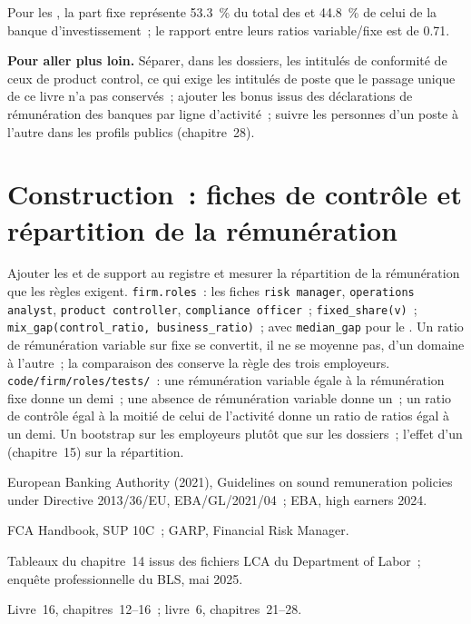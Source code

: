Pour les , la part fixe représente 53.3~\% du total des  et 44.8~\% de celui de la banque d'investissement~; le rapport
entre leurs ratios variable/fixe est de 0.71.

\textbf{Pour aller plus loin.} Séparer, dans les dossiers, les intitulés de conformité de ceux de product control, ce qui exige les intitulés de poste
que le passage unique de ce livre n'a pas conservés~; ajouter les bonus issus des déclarations de rémunération des banques par ligne d'activité~; suivre
les personnes d'un poste à l'autre dans les profils publics (chapitre~28).

\section{Construction~: fiches de contrôle et répartition de la rémunération}\label{bld:in:risk-operations-product-control-and-compliance:roles}

\begin{build}
 Ajouter les  et de support au registre et mesurer la répartition de la rémunération que les règles exigent.
 \texttt{firm.roles}~: les fiches \texttt{risk manager}, \texttt{operations analyst},
\texttt{product controller}, \texttt{compliance officer}~; \texttt{fixed\_share(v)}~; \texttt{mix\_gap(control\_ratio, business\_ratio)}~;
avec \texttt{median\_gap} pour le .
 Un ratio de rémunération variable sur fixe se convertit, il ne se moyenne pas, d'un domaine à l'autre~; la comparaison des  conserve
la règle des trois employeurs.
 \texttt{code/firm/roles/tests/}~: une rémunération variable égale à la rémunération fixe donne un demi~; une absence de rémunération variable donne
un~; un ratio de contrôle égal à la moitié de celui de l'activité donne un ratio de ratios égal à un demi.
 Un bootstrap sur les employeurs plutôt que sur les dossiers~; l'effet d'un  (chapitre~15) sur la répartition.
\end{build}

\begin{omsources}
\item European Banking Authority (2021), Guidelines on sound remuneration policies under Directive 2013/36/EU,
EBA/GL/2021/04~; EBA, high earners 2024.
\item FCA Handbook, SUP 10C~; GARP, Financial Risk Manager.
\item Tableaux du chapitre~14 issus des fichiers LCA du Department of Labor~; enquête professionnelle du BLS, mai 2025.
\item Livre~16, chapitres~12--16~; livre~6, chapitres~21--28.
\end{omsources}

